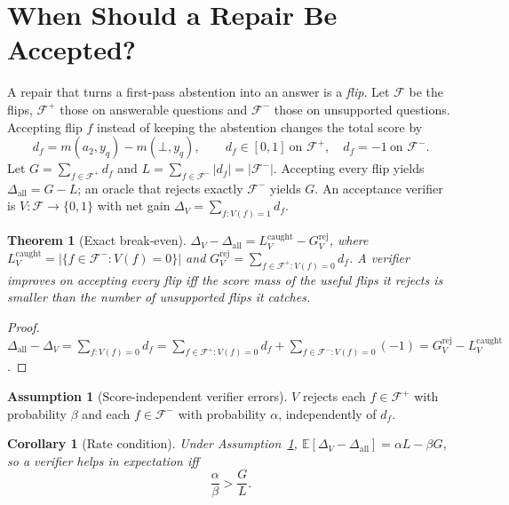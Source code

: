 \documentclass[10pt]{article}
\theoremstyle{plain}
\newtheorem{theorem}{Theorem}
\newtheorem{corollary}{Corollary}
\theoremstyle{definition}
\newtheorem{assumption}{Assumption}
\theoremstyle{remark}
\newcommand{\F}{\mathcal{F}}
\begin{document}
\section{When Should a Repair Be Accepted?}
\label{sec:accept}

A repair that turns a first-pass abstention into an answer is a \emph{flip}. Let
$\F$ be the flips, $\F^+$ those on answerable questions and $\F^-$ those on
unsupported questions. Accepting flip $f$ instead of keeping the abstention changes
the total score by
\begin{equation}
d_f=m(a_2,y_q)-m(\bot,y_q),\qquad d_f\in[0,1]\ \text{on }\F^+,\quad d_f=-1\ \text{on }\F^-.
\label{eq:delta}
\end{equation}
Let $G=\sum_{f\in\F^+}d_f$ and $L=\sum_{f\in\F^-}|d_f|=|\F^-|$. Accepting every flip
yields $\Delta_{\mathrm{all}}=G-L$; an oracle that rejects exactly $\F^-$ yields $G$.
An acceptance verifier is $V:\F\to\{0,1\}$ with net gain
$\Delta_V=\sum_{f:V(f)=1}d_f$.

\begin{theorem}[Exact break-even]
\label{thm:breakeven}
$\Delta_V-\Delta_{\mathrm{all}}=L_V^{\mathrm{caught}}-G_V^{\mathrm{rej}}$, where
$L_V^{\mathrm{caught}}=|\{f\in\F^-:V(f)=0\}|$ and
$G_V^{\mathrm{rej}}=\sum_{f\in\F^+:V(f)=0}d_f$. A verifier improves on accepting
every flip iff the score mass of the useful flips it rejects is smaller than the
number of unsupported flips it catches.
\end{theorem}

\begin{proof}
$\Delta_{\mathrm{all}}-\Delta_V=\sum_{f:V(f)=0}d_f=\sum_{f\in\F^+:V(f)=0}d_f+\sum_{f\in\F^-:V(f)=0}(-1)
=G_V^{\mathrm{rej}}-L_V^{\mathrm{caught}}$.
\end{proof}

\begin{assumption}[Score-independent verifier errors]
\label{ass:indep}
$V$ rejects each $f\in\F^+$ with probability $\beta$ and each $f\in\F^-$ with
probability $\alpha$, independently of $d_f$.
\end{assumption}

\begin{corollary}[Rate condition]
\label{cor:rate}
Under Assumption~\ref{ass:indep}, $\mathbb{E}[\Delta_V-\Delta_{\mathrm{all}}]=\alpha L-\beta G$, so
a verifier helps in expectation iff
\begin{equation}
\frac{\alpha}{\beta}>\frac{G}{L}.
\label{eq:rate}
\end{equation}
\end{corollary}
\end{document}
